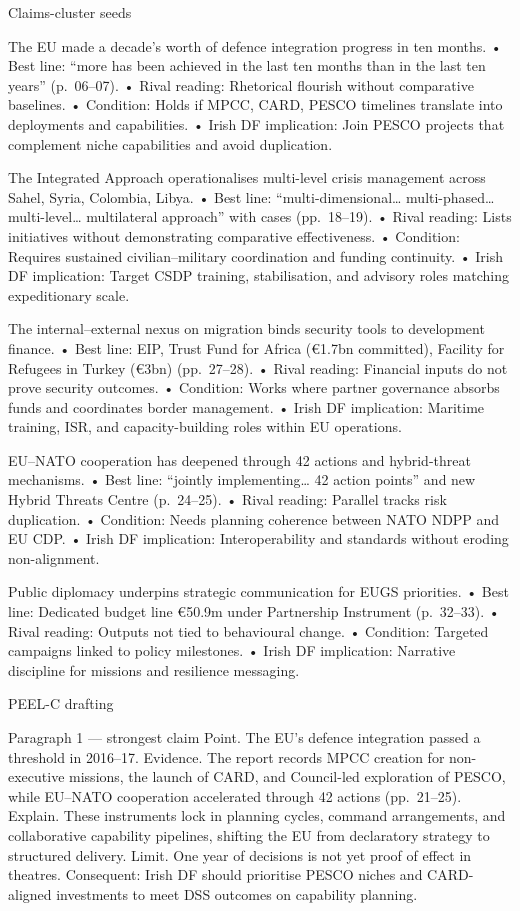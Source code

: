 Claims-cluster seeds

The EU made a decade’s worth of defence integration progress in ten months.
• Best line: “more has been achieved in the last ten months than in the last ten years” (p.\ 06–07).
• Rival reading: Rhetorical flourish without comparative baselines.
• Condition: Holds if MPCC, CARD, PESCO timelines translate into deployments and capabilities.
• Irish DF implication: Join PESCO projects that complement niche capabilities and avoid duplication.

The Integrated Approach operationalises multi-level crisis management across Sahel, Syria, Colombia, Libya.
• Best line: “multi-dimensional… multi-phased… multi-level… multilateral approach” with cases (pp.\ 18–19).
• Rival reading: Lists initiatives without demonstrating comparative effectiveness.
• Condition: Requires sustained civilian–military coordination and funding continuity.
• Irish DF implication: Target CSDP training, stabilisation, and advisory roles matching expeditionary scale.

The internal–external nexus on migration binds security tools to development finance.
• Best line: EIP, Trust Fund for Africa (€1.7bn committed), Facility for Refugees in Turkey (€3bn) (pp.\ 27–28).
• Rival reading: Financial inputs do not prove security outcomes.
• Condition: Works where partner governance absorbs funds and coordinates border management.
• Irish DF implication: Maritime training, ISR, and capacity-building roles within EU operations.

EU–NATO cooperation has deepened through 42 actions and hybrid-threat mechanisms.
• Best line: “jointly implementing… 42 action points” and new Hybrid Threats Centre (p.\ 24–25).
• Rival reading: Parallel tracks risk duplication.
• Condition: Needs planning coherence between NATO NDPP and EU CDP.
• Irish DF implication: Interoperability and standards without eroding non-alignment.

Public diplomacy underpins strategic communication for EUGS priorities.
• Best line: Dedicated budget line €50.9m under Partnership Instrument (p.\ 32–33).
• Rival reading: Outputs not tied to behavioural change.
• Condition: Targeted campaigns linked to policy milestones.
• Irish DF implication: Narrative discipline for missions and resilience messaging.

PEEL-C drafting

Paragraph 1 — strongest claim
Point. The EU’s defence integration passed a threshold in 2016–17.
Evidence. The report records MPCC creation for non-executive missions, the launch of CARD, and Council-led exploration of PESCO, while EU–NATO cooperation accelerated through 42 actions (pp.\ 21–25).
Explain. These instruments lock in planning cycles, command arrangements, and collaborative capability pipelines, shifting the EU from declaratory strategy to structured delivery.
Limit. One year of decisions is not yet proof of effect in theatres.
Consequent: Irish DF should prioritise PESCO niches and CARD-aligned investments to meet DSS outcomes on capability planning.

